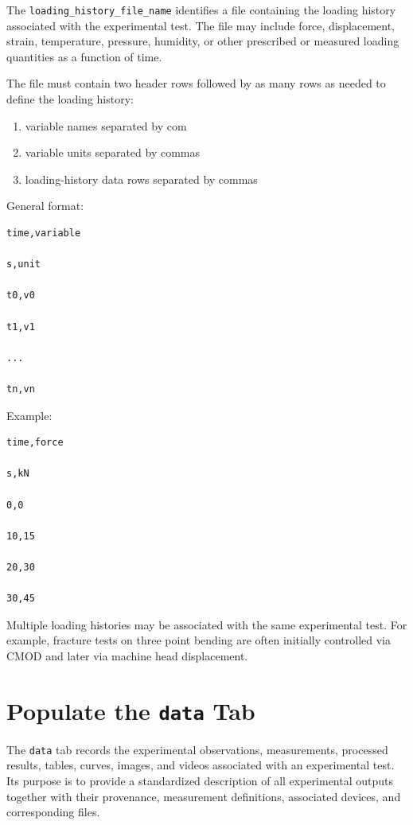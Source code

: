 \documentclass[11pt]{book}
\begin{document}
The \texttt{loading\_history\_file\_name} identifies a file containing the loading history
associated with the experimental test. The file may include force, displacement, strain,
temperature, pressure, humidity, or other prescribed or measured loading quantities as a
function of time.

The file must contain two header rows followed by as many rows as needed to define the
loading history:

\begin{enumerate}
    \item variable names separated by com
    \item variable units separated by commas
    \item loading-history data rows separated by commas
\end{enumerate}

General format:

\begin{verbatim}
time,variable

s,unit

t0,v0

t1,v1

...

tn,vn
\end{verbatim}

Example:

\begin{verbatim}
time,force

s,kN

0,0

10,15

20,30

30,45
\end{verbatim}

Multiple loading histories may be associated with the same experimental test. For example, fracture tests on three point bending are often initially controlled via CMOD and later via machine head displacement.


\section{Populate the \texttt{data} Tab}

The \texttt{data} tab records the experimental observations, measurements, processed results,
tables, curves, images, and videos associated with an experimental test. Its purpose is to
provide a standardized description of all experimental outputs together with their provenance,
measurement definitions, associated devices, and corresponding files.
\end{document}

